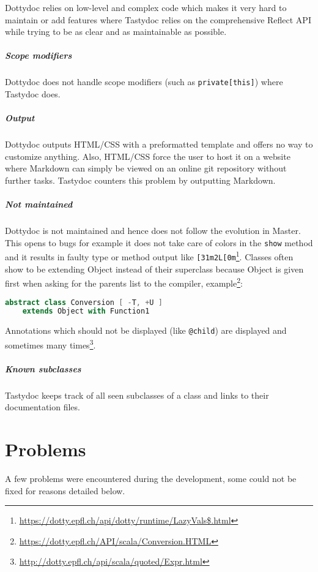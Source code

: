 \documentclass{report}
\begin{document}
Dottydoc relies on low-level and complex code which makes it very hard to maintain or add features where Tastydoc relies on the comprehensive Reflect API while trying to be as clear and as maintainable as possible.

\paragraph{Scope modifiers}
Dottydoc does not handle scope modifiers (such as \texttt{private[this]}) where Tastydoc does.

\paragraph{Output}
Dottydoc outputs HTML/CSS with a preformatted template and offers no way to customize anything. Also, HTML/CSS force the user to host it on a website where Markdown can simply be viewed on an online git repository without further tasks. Tastydoc counters this problem by outputting Markdown.

\paragraph{Not maintained}
Dottydoc is not maintained and hence does not follow the evolution in Master. This opens to bugs for example it does not take care of colors in the \texttt{show} method and it results in faulty type or method output like \texttt{[31m2L[0m}\footnote{\url{https://dotty.epfl.ch/api/dotty/runtime/LazyVals$.html}}. Classes often show to be extending Object instead of their superclass because Object is given first when asking for the parents list to the compiler, example\footnote{\url{https://dotty.epfl.ch/API/scala/Conversion.HTML}}:
\begin{lstlisting}[language=scala]
    abstract class Conversion [ -T, +U ]
    extends Object with Function1
\end{lstlisting}
Annotations which should not be displayed (like \texttt{@child}) are displayed and sometimes many times\footnote{\url{http://dotty.epfl.ch/api/scala/quoted/Expr.html}}.

\paragraph{Known subclasses}
Tastydoc keeps track of all seen subclasses of a class and links to their documentation files.

\chapter{Problems}
\label{sec:problems}
A few problems were encountered during the development, some could not be fixed for reasons detailed below.
\end{document}
